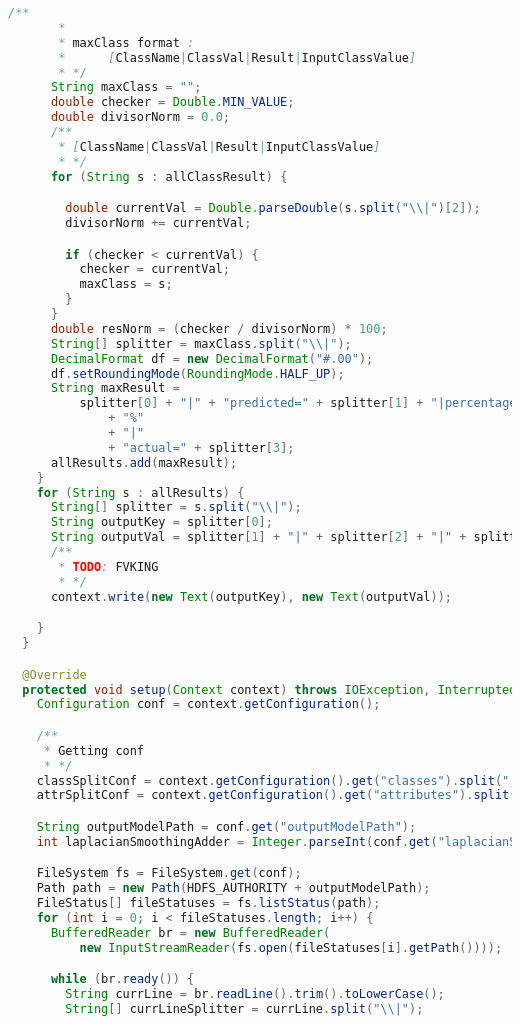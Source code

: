 \begin{lstlisting}[language=Java,basicstyle=\tiny,caption=TestingMapper.java]
      /**
       *
       * maxClass format :
       *      [ClassName|ClassVal|Result|InputClassValue]
       * */
      String maxClass = "";
      double checker = Double.MIN_VALUE;
      double divisorNorm = 0.0;
      /**
       * [ClassName|ClassVal|Result|InputClassValue]
       * */
      for (String s : allClassResult) {

        double currentVal = Double.parseDouble(s.split("\\|")[2]);
        divisorNorm += currentVal;

        if (checker < currentVal) {
          checker = currentVal;
          maxClass = s;
        }
      }
      double resNorm = (checker / divisorNorm) * 100;
      String[] splitter = maxClass.split("\\|");
      DecimalFormat df = new DecimalFormat("#.00");
      df.setRoundingMode(RoundingMode.HALF_UP);
      String maxResult =
          splitter[0] + "|" + "predicted=" + splitter[1] + "|percentage=" + df.format(resNorm)
              + "%"
              + "|"
              + "actual=" + splitter[3];
      allResults.add(maxResult);
    }
    for (String s : allResults) {
      String[] splitter = s.split("\\|");
      String outputKey = splitter[0];
      String outputVal = splitter[1] + "|" + splitter[2] + "|" + splitter[3];
      /**
       * TODO: FVKING
       * */
      context.write(new Text(outputKey), new Text(outputVal));

    }
  }

  @Override
  protected void setup(Context context) throws IOException, InterruptedException {
    Configuration conf = context.getConfiguration();

    /**
     * Getting conf
     * */
    classSplitConf = context.getConfiguration().get("classes").split(";");
    attrSplitConf = context.getConfiguration().get("attributes").split(";");

    String outputModelPath = conf.get("outputModelPath");
    int laplacianSmoothingAdder = Integer.parseInt(conf.get("laplacianSmoothingAdder"));

    FileSystem fs = FileSystem.get(conf);
    Path path = new Path(HDFS_AUTHORITY + outputModelPath);
    FileStatus[] fileStatuses = fs.listStatus(path);
    for (int i = 0; i < fileStatuses.length; i++) {
      BufferedReader br = new BufferedReader(
          new InputStreamReader(fs.open(fileStatuses[i].getPath())));

      while (br.ready()) {
        String currLine = br.readLine().trim().toLowerCase();
        String[] currLineSplitter = currLine.split("\\|");


\end{lstlisting}
